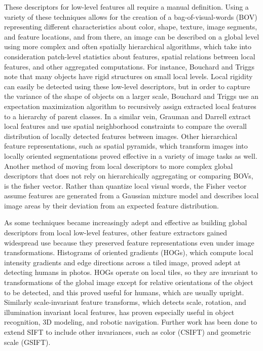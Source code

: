 These descriptors for low-level features all require a manual definition. Using a variety of these techniques allows for the creation of a bag-of-visual-words (BOV) representing different characteristics about color, shape, texture, image segments, and feature locations, and from there, an image can be described on a global level using more complex and often spatially hierarchical algorithms, which take into consideration patch-level statistics about features, spatial relations between local features, and other aggregated computations. For instance, Bouchard and Triggs note that many objects have rigid structures on small local levels. Local rigidity can easily be detected using these low-level descriptors, but in order to capture the variance of the shape of objects on a larger scale, Bouchard and Triggs use an expectation maximization algorithm to recursively assign extracted local features to a hierarchy of parent classes.\cite{bouchard2005hierarchical} In a similar vein, Grauman and Darrell extract local features and use spatial neighborhood constraints to compare the overall distribution of locally detected features between images.\cite{grauman2005efficient} Other hierarchical feature representations, such as spatial pyramids, which transform images into locally oriented segmentations proved effective in a variety of image tasks as well\cite{yang2009linear}\cite{girshick2014rich}\cite{lazebnik2006beyond}. Another method of moving from local descriptors to more complex global descriptors that does not rely on hierarchically aggregating or comparing BOVs, is the fisher vector. Rather than quantize local visual words, the Fisher vector assume features are generated from a Gaussian mixture model and describes local image areas by their deviation from an expected feature distribution.\cite{sanchez2013image}

As some techniques became increasingly adept and effective as building global descriptors from local low-level features, other feature extractors gained widespread use because they preserved feature representations even under image transformations. Histograms of oriented gradients (HOGs), which compute local intensity gradients and edge directions across a tiled image, proved adept at detecting humans in photos.\cite{dalal2005histograms} HOGs operate on local tiles, so they are invariant to transformations of the global image except for relative orientations of the object to be detected, and this proved useful for humans, which are usually upright. Similarly scale-invariant feature transforms, which detects scale, rotation, and illumination invariant local features, has proven especially useful in object recognition, 3D modeling, and robotic navigation.\cite{lowe1999object} Further work has been done to extend SIFT to include other invariances, such as color (CSIFT) and geometric scale (GSIFT).\cite{abdel2006csift}\cite{lodha2005gsift}

